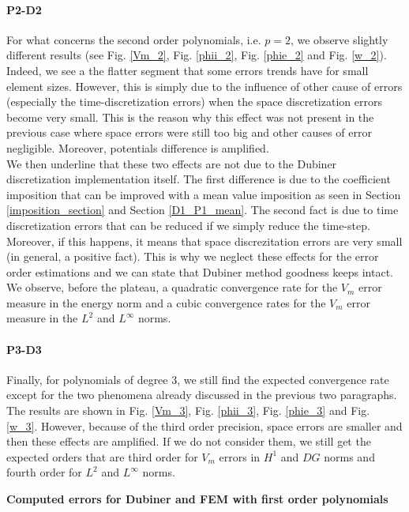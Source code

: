 \documentclass[a4paper,11pt]{article}
\begin{document}
\paragraph{P2-D2} \label{P2-D2}
\noindent  For what concerns the second order polynomials, i.e. $p=2$, we observe slightly different results (see Fig. \ref{Vm_2}, Fig. \ref{phii_2}, Fig. \ref{phie_2} and Fig. \ref{w_2}). Indeed, we see a the flatter segment that some errors trends have for small element sizes. However, this is simply due to the influence of other cause of errors (especially the time-discretization errors) when the space discretization errors become very small. This is the reason why this effect was not present in the previous case where space errors were still too big and other causes of error negligible. Moreover, potentials difference is amplified. \\
We then underline that these two effects are not due to the Dubiner discretization implementation itself. The first difference is due to the coefficient imposition that can be improved with a mean value imposition as seen in Section \ref{imposition_section} and Section \ref{D1_P1_mean}. The second fact is due to time discretization errors that can be reduced if we simply reduce the time-step. Moreover, if this happens, it means that space discrezitation errors are very small (in general, a positive fact). This is why we neglect these effects for the error order estimations and we can state that Dubiner method goodness keeps intact. \\
We observe, before the plateau, a quadratic convergence rate for the $V_m$ error measure in the energy norm and a cubic convergence rates for the $V_m$ error measure in the $L^2$ and $L^\infty$ norms.
\paragraph{P3-D3}
\noindent Finally, for polynomials of degree 3, we still find the expected convergence rate except for the two phenomena already discussed in the previous two paragraphs. The results are shown in Fig. \ref{Vm_3}, Fig. \ref{phii_3}, Fig. \ref{phie_3} and Fig. \ref{w_3}. However, because of the third order precision, space errors are smaller and then these effects are amplified. If we do not consider them, we still get the expected orders that are third order for $V_m$ errors in $H^1$ and $DG$ norms and fourth order for $L^2$ and $L^\infty$ norms.\\

\newpage
{}
\begin{center}
\textbf{Computed errors for Dubiner and FEM with first order polynomials}
\end{center}
\end{document}
